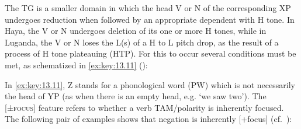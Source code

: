 \documentclass[output=paper]{langsci/langscibook}
\begin{document}
The \gls{TG} is a smaller domain in which the head V or N of the corresponding
XP undergoes reduction when followed by an appropriate dependent with H tone.
In Haya, the V or N undergoes deletion of its one or more H tones, while in
Luganda, the V or N loses the L(s) of a H to L pitch drop, as the result of a
process of H tone plateauing (\gls{HTP}). For this to occur
several conditions must be met, as schematized in \eqref{ex:key:13.11}
(\citealt[75]{HymanKatamba2010}):

\begin{exe}
    \ex\label{ex:key:13.11} 
\end{exe}
In \eqref{ex:key:13.11}, Z stands for a phonological word (\gls{PW})
which is not necessarily the head of YP (as when there is an empty head, e.g.
‘we saw two’).  The [±\textsc{focus}] feature refers to whether a verb
\gls{TAM}/polarity is inherently focused. The following pair of examples shows
that negation is inherently [+focus] (cf.\ \citealt{HymanWatters1984}):
\end{document}
